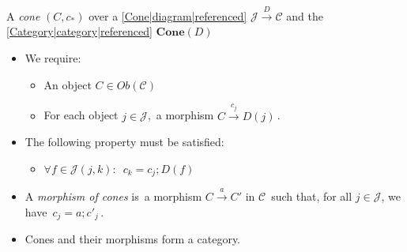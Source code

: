 
A \emph{cone} $(C,c_*)$ over a \ref{Cone|diagram|referenced} $\mathcal{J}\xrightarrow{D}\mathcal{C}$ and the \ref{Category|category|referenced} $\mathbf{Cone}(D)$

\begin{itemize}
    \item  We require:
          \begin{itemize}
            \item An object $C \in Ob(\mathcal{C})$
            \item For each object $j \in \mathcal{J}$, \,a morphism $C \xrightarrow{c_j}D(j)$\,.
          \end{itemize}
    \item The following property must be satisfied:
          \begin{itemize}
            \item $\forall f \in \mathcal{J}(j,k):$ \,$c_k=c_j;D(f)$\,
          \end{itemize}
    \item A \emph{morphism of cones} is \,a morphism $C \xrightarrow{a} C'$ in $\mathcal{C}$\, such that, for all $j \in \mathcal{J}$, we have \,$c_j=a;c'_j$\,.
    \item Cones and their morphisms form a category.
  \end{itemize}
